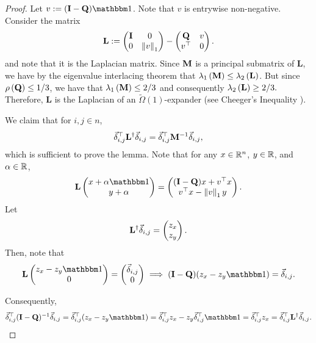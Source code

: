 \begin{proof}
Let $v := (\I-\Q) \one$. Note that $v$ is entrywise non-negative. Consider the matrix 
\begin{align*}
    \mathbf{L} := \begin{pmatrix}
        \mathbf{I} & 0 \\
        0 & \left\Vert v \right\Vert_1
    \end{pmatrix} - \begin{pmatrix}
        \mathbf{Q} & v \\
        v^\top & 0
    \end{pmatrix}. 
\end{align*}
and note that it is the Laplacian matrix. Since $\mathbf{M}$ is a principal submatrix of $\mathbf{L}$, we have by the eigenvalue interlacing theorem \cite{hwang2004cauchy} that $\lambda_1 \left( \mathbf{M} \right) \leq \lambda_2 \left(  \mathbf{L}  \right)$. But since $\rho\left( \mathbf{Q} \right) \leq 1/3$, we have that $\lambda_1 \left( \mathbf{M} \right) \leq 2/3$ and consequently  $\lambda_2\left( \mathbf{L} \right) \geq 2/3.$ Therefore, $\mathbf{L}$ is the Laplacian of an $\widetilde{\Omega}(1)$-expander (see Cheeger's Inequality ).

We claim that for $i,j \in n$, 
\begin{align*}
    \vec{\delta}_{i,j}^\top \mathbf{L}^\dagger \vec{\delta}_{i,j} = \vec{\delta}_{i,j}^\top \mathbf{M}^{-1} \vec{\delta}_{i,j}, 
\end{align*}
which is sufficient to prove the lemma. Note that for any $x \in \mathbb{R}^n$, $y \in \mathbb{R}$, and $\alpha \in \mathbb{R}$, 
\begin{align*}
    \mathbf{L} \begin{pmatrix}
        x + \alpha \one \\
        y + \alpha
    \end{pmatrix} = \begin{pmatrix}
        (\I - \Q) x + v^\top x \\
        v^\top x - \Norm{v}_1 y 
    \end{pmatrix}. 
\end{align*}
Let 
\begin{align*}
    \mathbf{L}^\dagger \vec{\delta}_{i,j} = \begin{pmatrix}
        z_x \\
        z_y
    \end{pmatrix}. 
\end{align*}
Then, note that 
\begin{align*}
    \mathbf{L} \begin{pmatrix}
        z_x - z_y \one \\
        0
    \end{pmatrix} = \begin{pmatrix}
        \deltaij \\
        0
    \end{pmatrix} \implies (\I - \Q) (z_x - z_y \one) = \deltaij. 
\end{align*}

Consequently, 
\begin{align*}
    \deltaij^\top (\I - \Q)^{-1} \deltaij = \deltaij^\top (z_x - z_y \one) = \deltaij^\top z_x - z_y \deltaij^\top \one = \deltaij^\top z_x = \deltaij^\top \Ldagger \deltaij. 
\end{align*}
\end{proof}


